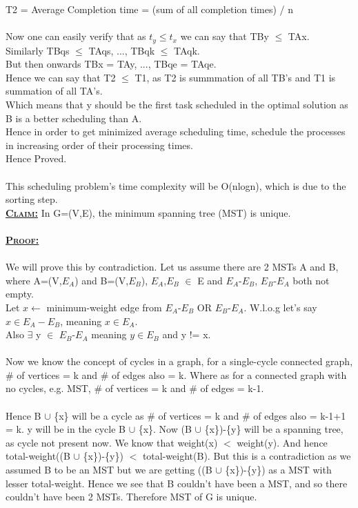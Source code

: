 \documentclass[a4 paper]{article}
\begin{document}
T2 = Average Completion time = (sum of all completion times) / n\\\\
Now one can easily verify that as $t_{y} \leq t_{x}$ we can say that TBy $\leq$ TAx.\\
Similarly TBqs $\leq$ TAqs, ..., TBqk $\leq$ TAqk. \\
But then onwards  TBx = TAy, ..., TBqe = TAqe.\\
Hence we can say that T2 $\leq$ T1, as T2 is summmation of all TB's and T1 is summation of all TA's.\\
Which means that y should be the first task scheduled in the optimal solution as B is a better scheduling than A.\\
Hence in order to get minimized average scheduling time, schedule the processes in increasing order of their processing times.\\
Hence Proved.\\\\
This scheduling problem's time complexity will be O(nlogn), which is due to the sorting step. \\
\newpage
{}
\textbf{\underline{\textsc{Claim:}}} In G=(V,E), the minimum spanning tree (MST) is unique. \\\\
\textbf{\underline{\textsc{Proof:}}}\\\\
We will prove this by contradiction. Let us assume there are 2 MSTs A and B, where A=(V,$E_{A}$) and B=(V,$E_{B}$), $E_{A}$,$E_{B}$ $\in$ E and $E_{A}$-$E_{B}$, $E_{B}$-$E_{A}$ both not empty.\\
Let $x \leftarrow$ minimum-weight edge from $E_{A}$-$E_{B}$ OR $E_{B}$-$E_{A}$. W.l.o.g let's say $x \in E_{A}-E_{B}$, meaning $x \in E_{A}$. \\
Also $\exists$ y $\in$ $E_{B}$-$E_{A}$ meaning $y \in E_{B}$ and y != x.\\\\
Now we know the concept of cycles in a graph, for a single-cycle connected graph, \# of vertices = k and \# of edges also = k. Where as for a connected graph with no cycles, e.g. MST, \# of vertices = k and \# of edges = k-1.\\\\
Hence B $\cup$ \{x\} will be a cycle as \# of vertices = k and \# of edges also = k-1+1 = k. y will be in the cycle B $\cup$ \{x\}. Now (B $\cup$ \{x\})-\{y\} will be a spanning tree, as cycle not present now. We know that weight(x) $<$ weight(y). And hence total-weight((B $\cup$ \{x\})-\{y\}) $<$ total-weight(B). But this is a contradiction as we assumed B to be an MST but we are getting ((B $\cup$ \{x\})-\{y\}) as a MST with lesser total-weight. Hence we see that B couldn't have been a MST, and so there couldn't have been 2 MSTs. Therefore MST of G is unique.\\
\end{document}
